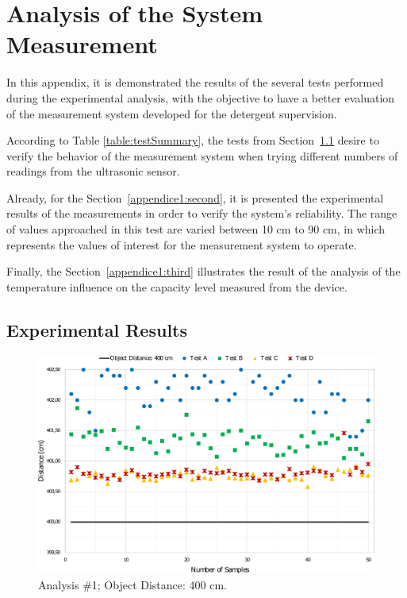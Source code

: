 \chapter{Analysis of the System Measurement}\label{apendice1}

In this appendix, it is demonstrated the results of the several tests performed during the experimental analysis, with the objective to have a better evaluation of the measurement system developed for the detergent supervision. 

According to Table \ref{table:testSummary}, the tests from Section~\ref{appendice1:first} desire to verify the behavior of the measurement system when trying different numbers of readings from the ultrasonic sensor.

Already, for the Section~\ref{appendice1:second}, it is presented the experimental results of the measurements in order to verify the system's reliability. The range of values approached in this test are varied between 10 cm to 90 cm, in which represents the values of interest for the measurement system to operate.

Finally, the Section~\ref{appendice1:third} illustrates the result of the analysis of the temperature influence on the capacity level measured from the device.

\clearpage
\section{Experimental Results}\label{appendice1:first}

\begin{figure}[h!]
    \centering
    \includegraphics[scale=0.52]{images/Results/testing_methodology/400cm.pdf}
     \caption{Analysis \#1; Object Distance: 400 cm.}
    \label{fig:400cm}
\end{figure}


